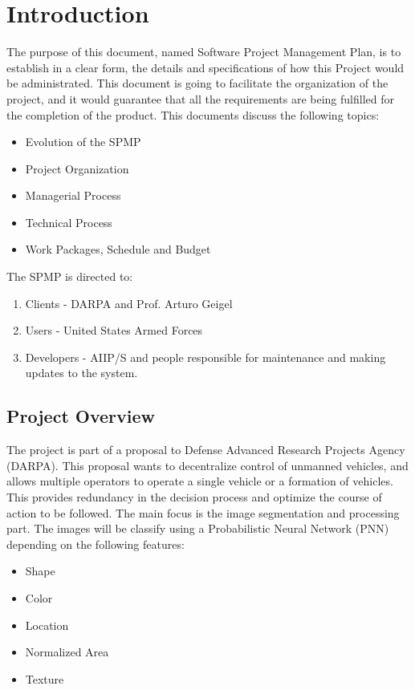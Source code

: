\documentclass[12pt]{article}
\begin{document}
\section{Introduction}
 The purpose of this document, named Software Project Management Plan, is to establish in a clear form, the details and specifications of how this Project would be administrated. This document is going to facilitate the organization of the project, and it would guarantee that all the requirements are being fulfilled for the completion of the product.  This documents discuss the following topics:
\begin{itemize}
  \item Evolution of the SPMP
  \item Project Organization
  \item Managerial Process
  \item Technical Process
  \item Work Packages, Schedule and Budget
\end{itemize}
The SPMP is directed to:
\begin{enumerate}
  \item Clients - DARPA and Prof. Arturo Geigel
  \item Users - United States Armed Forces
  \item Developers - AIIP/S and people responsible for maintenance and making updates to the system.
\end{enumerate}

\subsection{Project Overview}
  The project is part of a proposal to Defense Advanced Research Projects Agency (DARPA). This proposal wants to decentralize control of unmanned vehicles, and allows multiple operators to operate a single vehicle or a formation of vehicles. This provides redundancy in the decision process and optimize the course of action to be followed. The main focus is the image segmentation and processing part. The images will be classify using a Probabilistic Neural Network (PNN) depending on the following features:
  \begin{itemize}
    \item Shape
    \item Color
    \item Location
    \item Normalized Area
    \item Texture
  \end{itemize}
\end{document}
